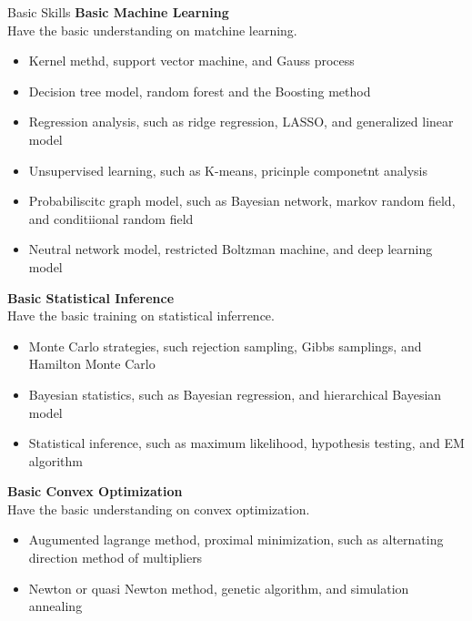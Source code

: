 \documentclass{resume} %
\begin{document}
\begin{rSection}{Basic Skills}
  {\bf Basic Machine Learning }\\
Have the basic understanding on matchine learning. 
  \vspace{-3mm}
  \begin{itemize}
\item Kernel methd, support vector machine, and Gauss process
\item Decision tree model, random forest and the Boosting method
\item Regression analysis, such as ridge regression, LASSO, and generalized linear model
\item Unsupervised learning,  such as K-means, pricinple componetnt analysis
\item Probabiliscitc graph model, such as Bayesian network, markov random field, and conditiional random field
\item Neutral network model, restricted Boltzman machine, and deep learning model
  \end{itemize}
{\bf Basic Statistical Inference}\\
Have the basic training on statistical inferrence. 
\vspace{-3mm}
\begin{itemize}
\item Monte Carlo strategies, such rejection sampling, Gibbs samplings, and Hamilton Monte Carlo
\item Bayesian statistics, such as Bayesian regression, and hierarchical Bayesian model
\item Statistical inference, such as maximum likelihood, hypothesis testing, and EM algorithm
\end{itemize}
{\bf Basic Convex Optimization}\\
Have the basic understanding on convex optimization.
\vspace{-3mm}
\begin{itemize}
\item Augumented lagrange method, proximal minimization, such as alternating direction method of multipliers
\item Newton or quasi Newton method, genetic algorithm, and simulation annealing
\end{itemize}
\end{rSection}
\end{document}
